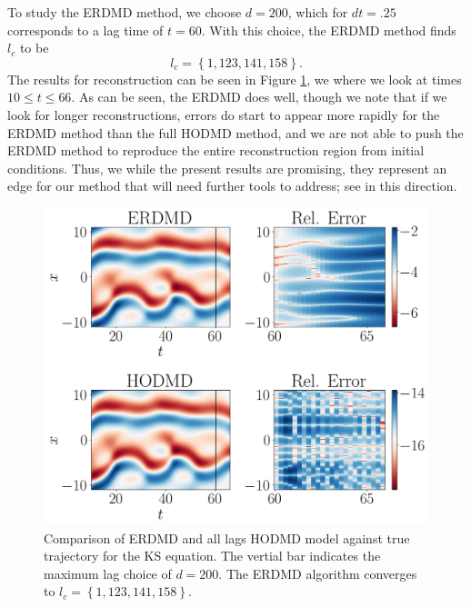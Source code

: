 \documentclass[a4paper,11pt]{article}
\begin{document}
To study the ERDMD method, we choose $d=200$, which for $dt=.25$ corresponds to a lag time of $t=60$.  With this choice, the ERDMD method finds $l_{c}$ to be 
\[
l_{c}=\left\{1, 123, 141, 158\right\}.
\]
The results for reconstruction can be seen in Figure \ref{fig:ks_compare_d_200}, we where we look at times $10\leq t \leq 66$.  As can be seen, the ERDMD does well, though we note that if we look for longer reconstructions, errors do start to appear more rapidly for the ERDMD method than the full HODMD method, and we are not able to push the ERDMD method to reproduce the entire reconstruction region from initial conditions.  Thus, we while the present results are promising, they represent an edge for our method that will need further tools to address; see \cite{curtis_dldmd} in this direction.    
\begin{figure}[!h]
\centering
\includegraphics[width=1\textwidth]{ks_dynamics_compare}
\caption{Comparison of ERDMD and all lags HODMD model against true trajectory for the KS equation.  The vertial bar indicates the maximum lag choice of $d=200$. The ERDMD algorithm converges to $l_{c}=\left\{1, 123, 141, 158\right\}$.}
\label{fig:ks_compare_d_200}
\end{figure} 
 
\end{document}
